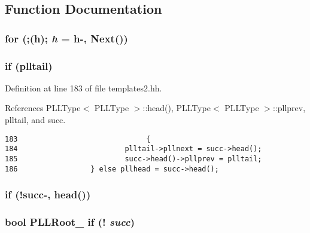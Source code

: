 \subsection{Function Documentation}
\subsubsection{\setlength{\rightskip}{0pt plus 5cm}for (;(h); {\em h} = h-, Next())}\label{templates2_8hh_a5}


\subsubsection{\setlength{\rightskip}{0pt plus 5cm}if ({\bf plltail})}\label{templates2_8hh_a9}




Definition at line 183 of file templates2.hh.

References PLLType$<$ PLLType $>$::head(), PLLType$<$ PLLType $>$::pllprev, plltail, and succ.



\footnotesize\begin{verbatim}183                              {
184                         plltail->pllnext = succ->head();
185                         succ->head()->pllprev = plltail;
186                 } else pllhead = succ->head();
\end{verbatim}\normalsize 
{}
\subsubsection{\setlength{\rightskip}{0pt plus 5cm}if (!{\bf succ}-, head())}\label{templates2_8hh_a8}


\subsubsection{\setlength{\rightskip}{0pt plus 5cm}bool PLLRoot\_\- if (! {\em succ})\hspace{0.3cm}{\tt  [inline]}}\label{templates2_8hh_a7}


